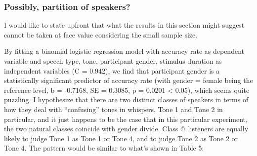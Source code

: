 \documentclass[12pt,letterpaper]{scrartcl}
\makeatletter
\newcommand*{\rom}[1]{\expandafter\@slowromancap\romannumeral #1@}
\makeatother
\begin{document}
\subsubsection{Possibly, partition of speakers?}

I would like to state upfront that what the results in this section might suggest cannot be taken at face value considering the small sample size. 

By fitting a binomial logistic regression model with accuracy rate as dependent variable and speech type, tone, participant gender, stimulus duration as independent variables (C = 0.942), we find that participant gender is a statistically significant predictor of accuracy rate (with gender = female being the reference level, b = -0.7168, SE = 0.3085, p = 0.0201 < 0.05), which seems quite puzzling. I hypothesize that there are two distinct classes of speakers in terms of how they deal with ``confusing'' tones in whispers, Tone 1 and Tone 2 in particular, and it just happens to be the case that in this particular experiment, the two natural classes coincide with gender divide. Class \rom{1} listeners are equally likely to judge Tone 1 as Tone 1 or Tone 4, and to judge Tone 2 as Tone 2 or Tone 4. The pattern would be similar to what's shown in Table 5:

\end{document}

